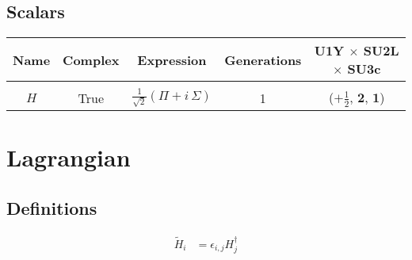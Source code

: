 \documentclass[12pt]{article}
\begin{document}
\subsection{Scalars}

\begin{table}[h]
\renewcommand{\arraystretch}{1.15}
\centering
\begin{tabular}{c@{\hskip .66cm}c@{\hskip .66cm}ccc}
\hline
Name & Complex & Expression & Generations & U1Y $\times$ SU2L $\times$ SU3c\\ \hline \\ [-2ex]
$H$ & True & $\frac{1}{\sqrt{2}} \left(\Pi + i\, \Sigma\right)$ & 1 & ($+\frac{1}{2}$, $\mathbf{2}$, $\mathbf{1}$) \\[.1cm] \hline
\end{tabular}
\end{table}

\section{Lagrangian}

\subsection{Definitions}
{\allowdisplaybreaks
\begin{align*}
\tilde{H}{}_{i} &= \epsilon_{i,j} H^{\dagger}_{j}\\
\end{align*}
}
\end{document}
